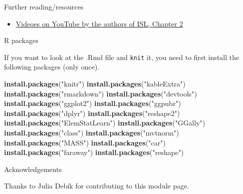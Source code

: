 \documentclass[ignorenonframetext,]{beamer}
\newenvironment{Shaded}{\begin{snugshade}}{\end{snugshade}}
\newcommand{\KeywordTok}[1]{\textcolor[rgb]{0.13,0.29,0.53}{\textbf{#1}}}
\newcommand{\StringTok}[1]{\textcolor[rgb]{0.31,0.60,0.02}{#1}}
\newcommand{\NormalTok}[1]{#1}
\providecommand{\tightlist}{%
  \setlength{\itemsep}{0pt}\setlength{\parskip}{0pt}}
\begin{document}
\begin{frame}{ Further reading/resources}

\begin{itemize}
\tightlist
\item
  \href{https://www.youtube.com/playlist?list=PL5-da3qGB5IDvuFPNoSqheihPOQNJpzyy}{Videoes
  on YouTube by the authors of ISL, Chapter 2}
\end{itemize}

\end{frame}

\begin{frame}[fragile]{ R packages}

If you want to look at the .Rmd file and \texttt{knit} it, you need to
first install the following packages (only once).

\begin{Shaded}
\begin{Highlighting}[]
\KeywordTok{install.packages}\NormalTok{(}\StringTok{"knitr"}\NormalTok{)}
\KeywordTok{install.packages}\NormalTok{(}\StringTok{"kableExtra"}\NormalTok{)}
\KeywordTok{install.packages}\NormalTok{(}\StringTok{"rmarkdown"}\NormalTok{)}
\KeywordTok{install.packages}\NormalTok{(}\StringTok{"devtools"}\NormalTok{)}
\KeywordTok{install.packages}\NormalTok{(}\StringTok{"ggplot2"}\NormalTok{)}
\KeywordTok{install.packages}\NormalTok{(}\StringTok{"ggpubr"}\NormalTok{)}
\KeywordTok{install.packages}\NormalTok{(}\StringTok{"dplyr"}\NormalTok{)}
\KeywordTok{install.packages}\NormalTok{(}\StringTok{"reshape2"}\NormalTok{)}
\KeywordTok{install.packages}\NormalTok{(}\StringTok{"ElemStatLearn"}\NormalTok{)}
\KeywordTok{install.packages}\NormalTok{(}\StringTok{"GGally"}\NormalTok{)}
\KeywordTok{install.packages}\NormalTok{(}\StringTok{"class"}\NormalTok{)}
\KeywordTok{install.packages}\NormalTok{(}\StringTok{"mvtnorm"}\NormalTok{)}
\KeywordTok{install.packages}\NormalTok{(}\StringTok{"MASS"}\NormalTok{)}
\KeywordTok{install.packages}\NormalTok{(}\StringTok{"car"}\NormalTok{)}
\KeywordTok{install.packages}\NormalTok{(}\StringTok{"faraway"}\NormalTok{)}
\KeywordTok{install.packages}\NormalTok{(}\StringTok{"reshape"}\NormalTok{)}
\end{Highlighting}
\end{Shaded}

\end{frame}

\begin{frame}{Acknowledgements}

Thanks to Julia Debik for contributing to this module page.

\end{frame}
\end{document}
